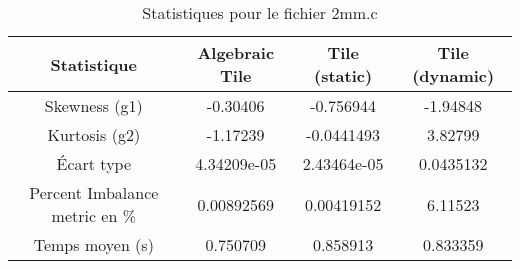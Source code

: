 \documentclass{article}
\begin{document}
\begin{table}[htbp]
  \centering
  \caption{Statistiques pour le fichier 2mm.c}
  \begin{tabular}{|c|c|c|c|}
    \hline
    Statistique & Algebraic Tile & Tile (static) & Tile (dynamic) \\ 
    \hline
    Skewness (g1) & -0.30406 & -0.756944 & -1.94848 \\ 
    Kurtosis (g2) & -1.17239 & -0.0441493 & 3.82799 \\ 
    Écart type & 4.34209e-05 & 2.43464e-05 & 0.0435132\\ 
    Percent Imbalance metric en \% & 0.00892569 & 0.00419152 & 6.11523\\ 
    Temps moyen (s) & 0.750709 & 0.858913 & 0.833359 \\ 
    \hline
  \end{tabular}
\end{table}
\newpage
\end{document}
